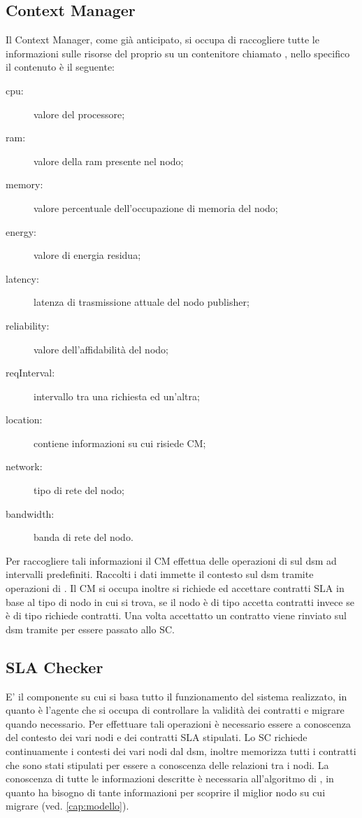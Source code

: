 \subsection{Context Manager}
Il Context Manager, come già anticipato, si occupa di raccogliere tutte le informazioni sulle risorse del proprio su un contenitore chiamato , nello specifico il contenuto è il seguente:
\begin{description}
	\item[cpu:] valore del processore;
	\item[ram:] valore della ram presente nel nodo;
	\item[memory:] valore percentuale dell'occupazione di memoria del nodo;
	\item[energy:] valore di energia residua;
	\item[latency:] latenza di trasmissione attuale del nodo publisher;
	\item[reliability:] valore dell'affidabilità del nodo;
	\item[reqInterval:] intervallo tra una richiesta ed un'altra;
	\item[location:] contiene informazioni su cui risiede CM;
	\item[network:] tipo di rete del nodo;
	\item[bandwidth:] banda di rete del nodo.
\end{description}
Per raccogliere tali informazioni il CM effettua delle operazioni di  sul dsm ad intervalli predefiniti. Raccolti i dati immette il contesto sul dsm tramite operazioni di . Il CM si occupa inoltre si richiede ed accettare contratti SLA in base al tipo di nodo in cui si trova, se il nodo è di tipo  accetta contratti invece se è di tipo  richiede contratti. Una volta accettatto un contratto viene rinviato sul dsm tramite  per essere passato allo SC.
\subsection{SLA Checker}
E' il componente su cui si basa tutto il funzionamento del sistema realizzato, in quanto è l'agente che si occupa di controllare la validità dei contratti e migrare quando necessario. Per effettuare tali operazioni è necessario essere a conoscenza del contesto dei vari nodi e dei contratti SLA stipulati. Lo SC richiede continuamente i contesti dei vari nodi dal dsm, inoltre memorizza tutti i contratti che sono stati stipulati per essere a conoscenza delle relazioni tra i nodi. La conoscenza di tutte le informazioni descritte è necessaria all'algoritmo di , in quanto ha bisogno di tante informazioni per scoprire il miglior nodo su cui migrare (ved. \ref{cap:modello}).